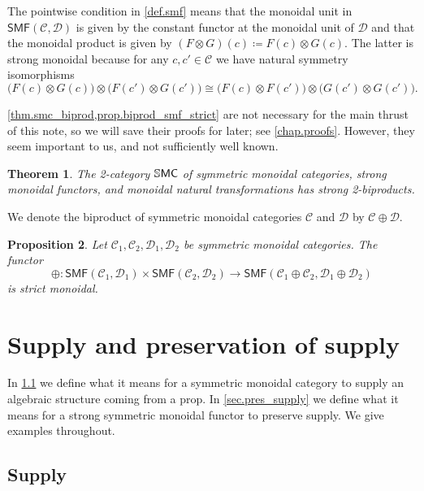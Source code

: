 \documentclass[11pt, oneside, article]{memoir}
\theoremstyle{plain}
\newtheorem{theorem}{Theorem}[chapter]
\newtheorem{proposition}[theorem]{Proposition}
\theoremstyle{definition}
\theoremstyle{remark}
\newcommand{\cat}[1]{\mathcal{#1}}%
\newcommand{\Cat}[1]{{\mathsf{#1}}}%
\newcommand{\CCat}[1]{\mathbb{\StrLeft{#1}{1}}\Cat{\StrGobbleLeft{#1}{1}}}%
\newcommand{\smf}{\Cat{SMF}}
\newcommand{\ssmc}{\CCat{SMC}}
\begin{document}
The pointwise condition in \cref{def.smf} means that the monoidal unit in $\smf(\cat{C},\cat{D})$ is given by the constant functor at the monoidal unit of $\cat{D}$ and that the monoidal product is given by $(F\otimes G)(c)\coloneqq F(c)\otimes G(c).$ The latter is strong monoidal because for any $c,c'\in\cat{C}$ we have natural symmetry isomorphisms
\[
	\big(F(c)\otimes G(c)\big)\otimes\big(F(c')\otimes G(c')\big)
	\cong
	\big(F(c)\otimes F(c')\big)\otimes\big(G(c')\otimes G(c')\big).
\]

\cref{thm.smc_biprod,prop.biprod_smf_strict} are not necessary for the main thrust of this note, so we will save their proofs for later; see \cref{chap.proofs}. %
However, they seem important to us, and not sufficiently well known. 

\begin{theorem}\label{thm.smc_biprod}
The 2-category $\ssmc$ of symmetric monoidal categories, strong monoidal functors, and monoidal natural transformations has strong 2-biproducts.
\end{theorem}

We denote the biproduct of symmetric monoidal categories $\cat{C}$ and $\cat{D}$ by $\cat{C}\oplus\cat{D}$.

\begin{proposition}\label{prop.biprod_smf_strict}
Let $\cat{C}_1,\cat{C}_2,\cat{D}_1,\cat{D}_2$ be symmetric monoidal categories. The functor
\[
  \oplus\colon
  \smf(\cat{C}_1,\cat{D}_1)\times\smf(\cat{C}_2,\cat{D}_2)
  \to
  \smf(\cat{C}_1\oplus\cat{C}_2,\cat{D}_1\oplus\cat{D}_2)
\]
is strict monoidal.
\end{proposition}

\chapter{Supply and preservation of supply}

In \cref{sec.supply} we define what it means for a symmetric monoidal category to supply an algebraic structure coming from a prop. In \cref{sec.pres_supply} we define what it means for a strong symmetric monoidal functor to preserve supply. We give examples throughout.

\section{Supply}\label{sec.supply}
\end{document}
